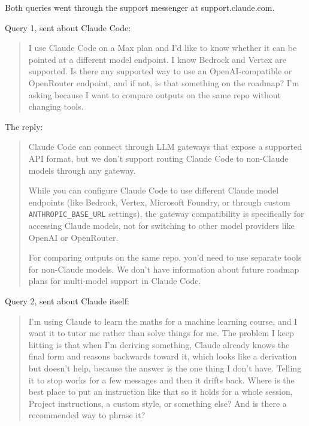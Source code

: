 \begin{answer}
  Both queries went through the support messenger at support.claude.com.

  \medskip
  Query 1, sent about Claude Code:

  \begin{quote}
  I use Claude Code on a Max plan and I'd like to know whether it can be pointed at a different
  model endpoint. I know Bedrock and Vertex are supported. Is there any supported way to use an
  OpenAI-compatible or OpenRouter endpoint, and if not, is that something on the roadmap? I'm asking
  because I want to compare outputs on the same repo without changing tools.
  \end{quote}

  The reply:

  \begin{quote}
  Claude Code can connect through LLM gateways that expose a supported API format, but we don't
  support routing Claude Code to non-Claude models through any gateway.

  While you can configure Claude Code to use different Claude model endpoints (like Bedrock, Vertex,
  Microsoft Foundry, or through custom \texttt{ANTHROPIC\_BASE\_URL} settings), the gateway
  compatibility is specifically for accessing Claude models, not for switching to other model
  providers like OpenAI or OpenRouter.

  For comparing outputs on the same repo, you'd need to use separate tools for non-Claude models. We
  don't have information about future roadmap plans for multi-model support in Claude Code.
  \end{quote}

  \medskip
  Query 2, sent about Claude itself:

  \begin{quote}
  I'm using Claude to learn the maths for a machine learning course, and I want it to tutor me
  rather than solve things for me. The problem I keep hitting is that when I'm deriving something,
  Claude already knows the final form and reasons backwards toward it, which looks like a derivation
  but doesn't help, because the answer is the one thing I don't have. Telling it to stop works for a
  few messages and then it drifts back. Where is the best place to put an instruction like that so
  it holds for a whole session, Project instructions, a custom style, or something else? And is
  there a recommended way to phrase it?
  \end{quote}


\end{answer}
